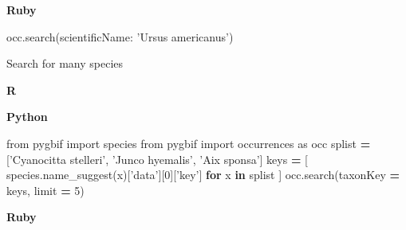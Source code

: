 \documentclass[author-year, review, 11pt]{components/elsarticle} %
\newenvironment{Shaded}{\begin{snugshade}}{\end{snugshade}}
\newcommand{\KeywordTok}[1]{\textcolor[rgb]{0.13,0.29,0.53}{\textbf{#1}}}
\newcommand{\DataTypeTok}[1]{\textcolor[rgb]{0.13,0.29,0.53}{#1}}
\newcommand{\DecValTok}[1]{\textcolor[rgb]{0.00,0.00,0.81}{#1}}
\newcommand{\StringTok}[1]{\textcolor[rgb]{0.31,0.60,0.02}{#1}}
\newcommand{\ImportTok}[1]{#1}
\newcommand{\OtherTok}[1]{\textcolor[rgb]{0.56,0.35,0.01}{#1}}
\newcommand{\ControlFlowTok}[1]{\textcolor[rgb]{0.13,0.29,0.53}{\textbf{#1}}}
\newcommand{\OperatorTok}[1]{\textcolor[rgb]{0.81,0.36,0.00}{\textbf{#1}}}
\newcommand{\NormalTok}[1]{#1}
\begin{document}
\textbf{Ruby}

\begin{Shaded}
\begin{Highlighting}[]
\NormalTok{occ.search(}\StringTok{scientificName: 'Ursus americanus'}\NormalTok{)}
\end{Highlighting}
\end{Shaded}

Search for many species

\textbf{R}

\begin{Shaded}
\end{Shaded}

\textbf{Python}

\begin{Shaded}
\begin{Highlighting}[]
\ImportTok{from}\NormalTok{ pygbif }\ImportTok{import}\NormalTok{ species}
\ImportTok{from}\NormalTok{ pygbif }\ImportTok{import}\NormalTok{ occurrences }\ImportTok{as}\NormalTok{ occ}
\NormalTok{splist }\OperatorTok{=}\NormalTok{ [}\StringTok{'Cyanocitta stelleri'}\NormalTok{, }\StringTok{'Junco hyemalis'}\NormalTok{, }\StringTok{'Aix sponsa'}\NormalTok{]}
\NormalTok{keys }\OperatorTok{=}\NormalTok{ [ species.name_suggest(x)[}\StringTok{'data'}\NormalTok{][}\DecValTok{0}\NormalTok{][}\StringTok{'key'}\NormalTok{] }\ControlFlowTok{for}\NormalTok{ x }\KeywordTok{in}\NormalTok{ splist ]}
\NormalTok{occ.search(taxonKey }\OperatorTok{=}\NormalTok{ keys, limit }\OperatorTok{=} \DecValTok{5}\NormalTok{)}
\end{Highlighting}
\end{Shaded}

\textbf{Ruby}
\end{document}
